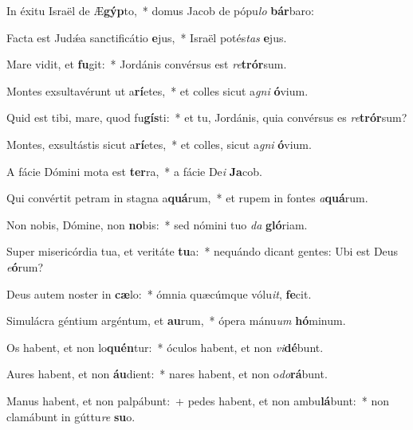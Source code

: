 \item In éxitu Israël de Æ\textbf{gýp}to,~* domus Jacob de pópu\textit{lo} \textbf{bár}baro:

\item Facta est Judǽa sanctificátio \textbf{e}jus,~* Israël potés\textit{tas} \textbf{e}jus.

\item Mare vidit, et \textbf{fu}git:~* Jordánis convérsus est \textit{re}\textbf{trór}sum.

\item Montes exsultavérunt ut a\textbf{rí}etes,~* et colles sicut a\textit{gni} \textbf{ó}vium.

\item Quid est tibi, mare, quod fu\textbf{gís}ti:~* et tu, Jordánis, quia convérsus es \textit{re}\textbf{trór}sum?

\item Montes, exsultástis sicut a\textbf{rí}etes,~* et colles, sicut a\textit{gni} \textbf{ó}vium.

\item A fácie Dómini mota est \textbf{ter}ra,~* a fácie De\textit{i} \textbf{Ja}cob.

\item Qui convértit petram in stagna a\textbf{quá}rum,~* et rupem in fontes \textit{a}\textbf{quá}rum.

\item Non nobis, Dómine, non \textbf{no}bis:~*  sed nómini tuo \textit{da} \textbf{gló}riam.

\item Super misericórdia tua, et veritáte \textbf{tu}a:~* nequándo dicant gentes: Ubi est Deus \textit{e}\textbf{ó}rum?

\item Deus autem noster in \textbf{cæ}lo:~* ómnia quæcúmque vólu\textit{it}, \textbf{fe}cit.

\item Simulácra géntium argéntum, et \textbf{au}rum,~* ópera mánu\textit{um} \textbf{hó}minum.

\item Os habent, et non lo\textbf{quén}tur:~* óculos habent, et non \textit{vi}\textbf{dé}bunt.

\item Aures habent, et non \textbf{áu}dient:~* nares habent, et non o\textit{do}\textbf{rá}bunt.

\item Manus habent, et non palpábunt:~+ pedes habent, et non ambu\textbf{lá}bunt:~* non clamábunt in gúttu\textit{re} \textbf{su}o.

